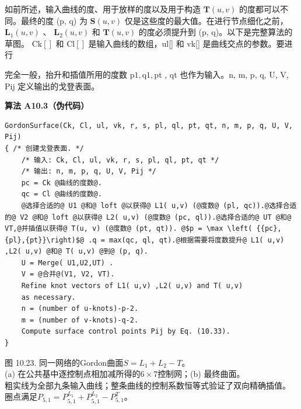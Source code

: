 \documentclass[../main.tex]{subfiles}
\begin{document}
如前所述，输入曲线的度、用于放样的度以及用于构造 \(\mathbf{T}\left( {u,v}\right)\) 的度都可以不同。最终的度 (p, q) 为 \(\mathbf{S}\left( {u,v}\right)\) 仅是这些度的最大值。在进行节点细化之前， \({\mathbf{L}}_{1}\left( {u,v}\right)\) 、 \({\mathbf{L}}_{2}\left( {u,v}\right)\) 和 \(\mathbf{T}\left( {u,v}\right)\) 的度必须提升到 (p, q)。以下是完整算法的草图。 \(\mathrm{{Ck}}\left\lbrack  \right\rbrack\) 和 \(\mathrm{{Cl}}\left\lbrack  \right\rbrack\) 是输入曲线的数组，ul[] 和 vk[] 是曲线交点的参数。要进行















完全一般，抬升和插值所用的度数 \(\mathrm{p}1,\mathrm{q}1,\mathrm{{pt}}\) , qt 也作为输入。n, m, p, q, U, V, Pij 定义输出的戈登表面。

\par\medskip\noindent\textbf{算法 A10.3（伪代码）}\par
\begin{verbatim}
GordonSurface(Ck, Cl, ul, vk, r, s, pl, ql, pt, qt, n, m, p, q, U, V, Pij)
{ /* 创建戈登表面. */
    /* 输入: Ck, Cl, ul, vk, r, s, pl, ql, pt, qt */
    /* 输出: n, m, p, q, U, V, Pij */
    pc = Ck @曲线的度数@.
    qc = Cl @曲线的度数@.
    @选择合适的@ U1 @和@ loft @以获得@ L1( u,v) (@度数@ (pl, qc)).@选择合适的@ V2 @和@ loft @以获得@ L2( u,v) (@度数@ (pc, ql)).@选择合适的@ UT @和@ VT,@并插值以获得@ T(u, v) (@度数@ (pt, qt)). @$p = \max \left( {{pc},{pl},{pt}}\right)$@ .q = max(qc, ql, qt).@根据需要将度数提升@ L1( u,v) ,L2( u,v) @和@ T( u,v) @到@ (p, q).
    U = Merge( U1,U2,UT) .
    V = @合并@(V1, V2, VT).
    Refine knot vectors of L1( u,v) ,L2( u,v) and T( u,v)
    as necessary.
    n = (number of u-knots)-p-2.
    m = (number of v-knots)-q-2.
    Compute surface control points Pij by Eq. (10.33).
}
\end{verbatim}



\begin{center}
\begin{minipage}{37cm}
\vspace*{.6\baselineskip}
\centering
{}
\par\smallskip
图 10.23. 同一网络的Gordon曲面$S=L_1+L_2-T$。\\
(a) 在公共基中逐控制点相加减所得的$6\times7$控制网；(b) 最终曲面。\\
粗实线为全部九条输入曲线；整条曲线的控制系数恒等式验证了双向精确插值。\\
圈点满足$P_{5,1}=P^{L_1}_{5,1}+P^{L_2}_{5,1}-P^T_{5,1}$。
\end{minipage}
\end{center}
\end{document}
